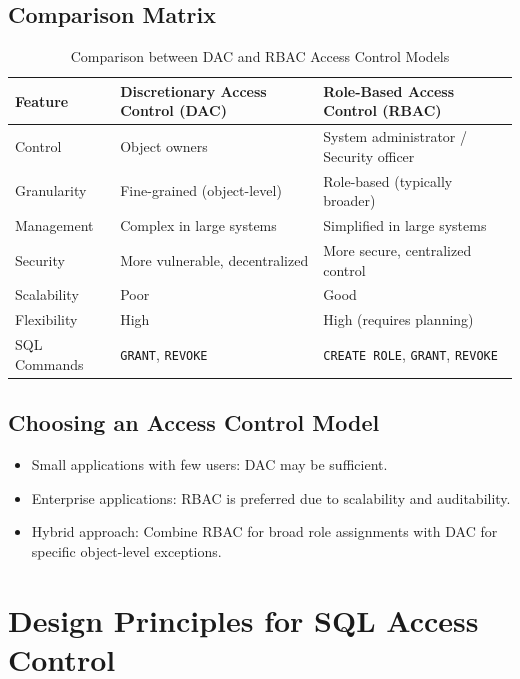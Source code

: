 \documentclass[12pt,a4paper]{article}
\begin{document}
\subsection{Comparison Matrix}

\begin{table}[h!]
\centering
\renewcommand{\arraystretch}{1.3}
\begin{tabular}{|l|p{4.5cm}|p{4.5cm}|}
\hline
\textbf{Feature} & \textbf{Discretionary Access Control (DAC)} & \textbf{Role-Based Access Control (RBAC)} \\
\hline
Control & Object owners & System administrator / Security officer \\
Granularity & Fine-grained (object-level) & Role-based (typically broader) \\
Management & Complex in large systems & Simplified in large systems \\
Security & More vulnerable, decentralized & More secure, centralized control \\
Scalability & Poor & Good \\
Flexibility & High & High (requires planning) \\
SQL Commands & \texttt{GRANT}, \texttt{REVOKE} & \texttt{CREATE ROLE}, \texttt{GRANT}, \texttt{REVOKE} \\
\hline
\end{tabular}
\caption{Comparison between DAC and RBAC Access Control Models}
\end{table}

\subsection{Choosing an Access Control Model}
\begin{itemize}
    \item Small applications with few users: DAC may be sufficient.
    \item Enterprise applications: RBAC is preferred due to scalability and auditability.
    \item Hybrid approach: Combine RBAC for broad role assignments with DAC for specific object-level exceptions.
\end{itemize}

\vspace{0.5cm}

\section{Design Principles for SQL Access Control}
\end{document}
